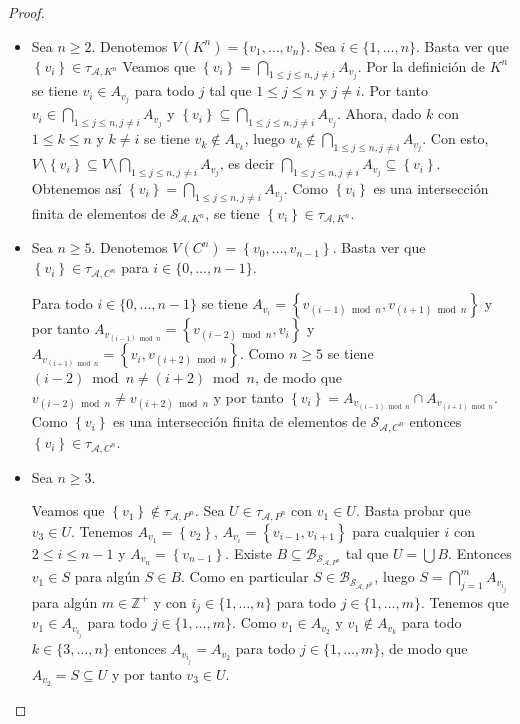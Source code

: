 \begin{proof}
   \phantom{o}
   \begin{itemize}
      \item[1.] Sea $n\ge 2$. Denotemos $V\left( K^n\right)=\{v_1,\dots, v_n\}$. Sea $i\in\{1,\dots, n\}$. Basta ver que $\left\lbrace v_i\right\rbrace\in \tau_{\mathcal{A},K^n}$ Veamos que $\left\lbrace v_i\right\rbrace=\bigcap_{1\le j\le n, j\ne i}A_{v_j}$. Por la definición de $K^n$ se tiene $v_i\in A_{v_j}$ para todo $j$ tal que $1\le j\le n$ y $j\ne i$. Por tanto $v_i\in\bigcap_{1\le j\le n, j\ne i} A_{v_j}$ y $\left\lbrace v_i\right\rbrace\subseteq \bigcap_{1\le j\le n, j\ne i} A_{v_j}$. Ahora, dado $k$ con $1\le k\le n$ y $k\ne i$ se tiene $v_k\notin A_{v_k}$, luego $v_k\notin \bigcap_{1\le j\le n, j\ne i} A_{v_j}$. Con esto, $V\setminus \left\lbrace v_i\right\rbrace\subseteq V\setminus \bigcap_{1\le j\le n, j\ne i} A_{v_j}$, es decir $\bigcap_{1\le j\le n, j\ne i} A_{v_j} \subseteq \left\lbrace v_i\right\rbrace$. Obtenemos así $\left\lbrace v_i\right\rbrace=\bigcap_{1\le j\le n, j\ne i} A_{v_j}$. Como $\left\lbrace v_i\right\rbrace$ es una intersección finita de elementos de $\mathcal{S}_{\mathcal{A},K^n}$, se tiene $\left\lbrace v_i\right\rbrace\in \tau_{\mathcal{A},K^n}$.
      \item[2.] Sea $n\ge 5$. Denotemos $V\left( C^n\right)=\left\lbrace v_0,\dots,v_{n-1}\right\rbrace$. Basta ver que $\left\lbrace v_i\right\rbrace\in\tau_{\mathcal{A},C^n}$ para $i\in\{0,\dots,n-1\}$.
         
         Para todo $i\in\{0,\dots,n-1\}$ se tiene $A_{v_i}=\left\lbrace v_{(i-1)\bmod n},v_{(i+1)\bmod n}\right\rbrace$ y por tanto $A_{v_{(i-1)\bmod n}}=\left\lbrace v_{(i-2)\bmod n},v_i\right\rbrace$ y $A_{v_{(i+1)\bmod n}}=\left\lbrace v_i,v_{(i+2)\bmod n}\right\rbrace$. Como $n\ge 5$ se tiene $(i-2)\bmod n\ne (i+2)\bmod n$, de modo que $v_{(i-2)\bmod n}\ne v_{(i+2)\bmod n}$ y por tanto $\left\lbrace v_i\right\rbrace=A_{v_{(i-1)\bmod n}}\cap A_{v_{(i+1)\bmod n}}$. Como $\left\lbrace v_i\right\rbrace$ es una intersección finita de elementos de $\mathcal{S}_{\mathcal{A},C^n}$ entonces $\left\lbrace v_i\right\rbrace\in\tau_{\mathcal{A},C^n}$.
      \item[3.] Sea $n\ge 3$.
         
         Veamos que $\left\lbrace v_1\right\rbrace\notin\tau_{\mathcal{A},P^n}$. Sea $U\in\tau_{\mathcal{A},P^n}$ con $v_1\in U$. Basta probar que $v_3\in U$. Tenemos $A_{v_1}=\left\lbrace v_2\right\rbrace$, $A_{v_i}=\left\lbrace v_{i-1},v_{i+1}\right\rbrace$ para cualquier $i$ con $2\le i\le n-1$ y $A_{v_n}=\left\lbrace v_{n-1}\right\rbrace$. Existe $B\subseteq\mathcal{B}_{\mathcal{S}_{\mathcal{A},P^n}}$ tal que $U=\bigcup B$. Entonces $v_1\in S$ para algún $S\in B$. Como en particular $S\in \mathcal{B}_{\mathcal{S}_{\mathcal{A},P^n}}$, luego $S=\bigcap_{j=1}^{m}A_{v_{i_j}}$ para algún $m\in \mathbb{Z}^+$ y con $i_j\in\{1,\dots,n\}$ para todo $j\in\{1,\dots,m\}$. Tenemos que $v_1\in A_{v_{i_j}}$ para todo $j\in\{1,\dots,m\}$. Como $v_1\in A_{v_2}$ y $v_1\notin A_{v_k}$ para todo $k\in\{3,\dots,n\}$ entonces $A_{v_{i_j}}=A_{v_2}$ para todo $j\in\{1,\dots,m\}$, de modo que $A_{v_2}=S\subseteq U$ y por tanto $v_3\in U$.

\end{itemize}
\end{proof}
